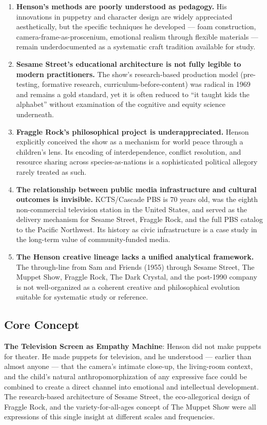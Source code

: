 \documentclass[11pt,letterpaper]{article}
\begin{document}
\begin{enumerate}[leftmargin=*]
  \item \textbf{Henson's methods are poorly understood as pedagogy.} His innovations in puppetry and character design are widely appreciated aesthetically, but the specific techniques he developed --- foam construction, camera-frame-as-proscenium, emotional realism through flexible materials --- remain underdocumented as a systematic craft tradition available for study.
  \item \textbf{Sesame Street's educational architecture is not fully legible to modern practitioners.} The show's research-based production model (pre-testing, formative research, curriculum-before-content) was radical in 1969 and remains a gold standard, yet it is often reduced to ``it taught kids the alphabet'' without examination of the cognitive and equity science underneath.
  \item \textbf{Fraggle Rock's philosophical project is underappreciated.} Henson explicitly conceived the show as a mechanism for world peace through a children's lens. Its encoding of interdependence, conflict resolution, and resource sharing across species-as-nations is a sophisticated political allegory rarely treated as such.
  \item \textbf{The relationship between public media infrastructure and cultural outcomes is invisible.} KCTS/Cascade PBS is 70 years old, was the eighth non-commercial television station in the United States, and served as the delivery mechanism for Sesame Street, Fraggle Rock, and the full PBS catalog to the Pacific Northwest. Its history as civic infrastructure is a case study in the long-term value of community-funded media.
  \item \textbf{The Henson creative lineage lacks a unified analytical framework.} The through-line from Sam and Friends (1955) through Sesame Street, The Muppet Show, Fraggle Rock, The Dark Crystal, and the post-1990 company is not well-organized as a coherent creative and philosophical evolution suitable for systematic study or reference.
\end{enumerate}

\subsection{Core Concept}

\textbf{The Television Screen as Empathy Machine}: Henson did not make puppets for theater. He made puppets for television, and he understood --- earlier than almost anyone --- that the camera's intimate close-up, the living-room context, and the child's natural anthropomorphization of any expressive face could be combined to create a direct channel into emotional and intellectual development. The research-based architecture of Sesame Street, the eco-allegorical design of Fraggle Rock, and the variety-for-all-ages concept of The Muppet Show were all expressions of this single insight at different scales and frequencies.
\end{document}
